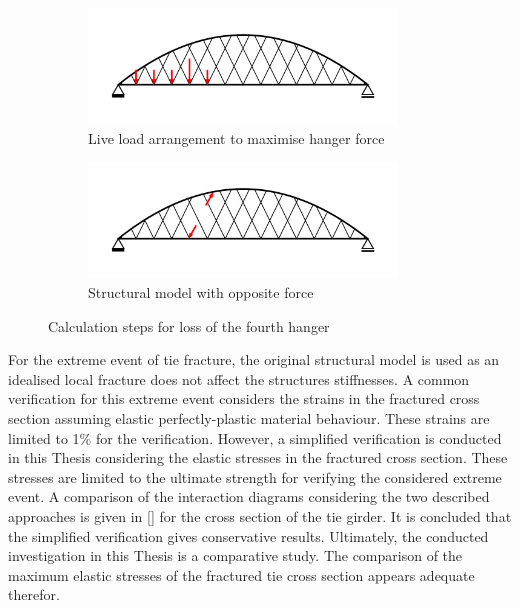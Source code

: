 \begin{figure}[H]
\centering
\begin{subfigure}{0.5\textwidth}
    \centering
    \includegraphics[trim={0 0.8cm 0 0.8cm},clip, width=0.9\textwidth]{illustrations/figures/cable loss - load arrangement.png}
    \caption{Live load arrangement to maximise hanger force}
    \label{fig:Cable_Loss_1}
\end{subfigure}%
\begin{subfigure}{.5\textwidth}
    \centering
    \includegraphics[trim={0 0.8cm 0 0.8cm},clip, width=0.9\textwidth]{illustrations/figures/cable loss.png}
    \caption{Structural model with opposite force}
    \label{fig:Cable_Loss_2}
\end{subfigure}
\caption{Calculation steps for loss of the fourth hanger}
\label{fig:Cable_Loss}
\end{figure}

For the extreme event of tie fracture, the original structural model is used as an idealised local fracture does not affect the structures stiffnesses. A common verification for this extreme event considers the strains in the fractured cross section assuming elastic perfectly-plastic material behaviour. These strains are limited to 1\% for the verification. However, a simplified verification is conducted in this Thesis considering the elastic stresses in the fractured cross section. These stresses are limited to the ultimate strength for verifying the considered extreme event. A comparison of the interaction diagrams considering the two described approaches is given in [] for the cross section of the tie girder. It is concluded that the simplified verification gives conservative results. Ultimately, the conducted investigation in this Thesis is a comparative study. The comparison of the maximum elastic stresses of the fractured tie cross section appears adequate therefor.

